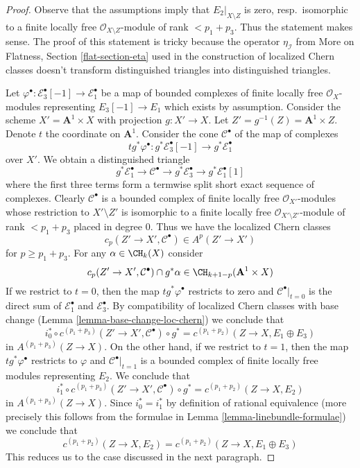 \begin{proof}
Observe that the assumptions imply that $E_2|_{X \setminus Z}$ is zero,
resp.\ isomorphic to a finite locally free $\mathcal{O}_{X \setminus Z}$-module
of rank $< p_1 + p_3$. Thus the statement makes sense. The proof of this
statement is tricky because the operator $\eta_\mathcal{I}$ from
More on Flatness, Section \ref{flat-section-eta} used in the construction
of localized Chern classes doesn't transform distinguished triangles into
distinguished triangles.

\medskip\noindent
Let $\varphi^\bullet : \mathcal{E}_3^\bullet[-1] \to \mathcal{E}_1^\bullet$
be a map of bounded complexes of finite locally free $\mathcal{O}_X$-modules
representing $E_3[-1] \to E_1$ which exists by assumption. Consider the scheme
$X' = \mathbf{A}^1 \times X$ with projection
$g : X' \to X$. Let $Z' = g^{-1}(Z) = \mathbf{A}^1 \times Z$.
Denote $t$ the coordinate on $\mathbf{A}^1$. Consider the cone
$\mathcal{C}^\bullet$ of the map of complexes
$$
t g^*\varphi^\bullet :
g^*\mathcal{E}_3^\bullet[-1]
\longrightarrow
g^*\mathcal{E}_1^\bullet
$$
over $X'$. We obtain a distinguished triangle
$$
g^*\mathcal{E}_1^\bullet \to \mathcal{C}^\bullet \to
g^*\mathcal{E}_3^\bullet \to g^*\mathcal{E}_1^\bullet[1]
$$
where the first three terms form a termwise split short exact
sequence of complexes. Clearly $\mathcal{C}^\bullet$ is a
bounded complex of finite locally free $\mathcal{O}_{X'}$-modules
whose restriction to $X' \setminus Z'$ is isomorphic to a
finite locally free
$\mathcal{O}_{X' \setminus Z'}$-module of rank $< p_1 + p_3$
placed in degree $0$. Thus we have the localized Chern classes
$$
c_p(Z' \to X', \mathcal{C}^\bullet) \in A^p(Z' \to X')
$$
for $p \geq p_1 + p_3$. For any $\alpha \in \CH_k(X)$ consider
$$
c_p(Z' \to X', \mathcal{C}^\bullet) \cap g^*\alpha
\in \CH_{k + 1 - p}(\mathbf{A}^1 \times X)
$$
If we restrict to $t = 0$, then the map $t g^*\varphi^\bullet$
restricts to zero and $\mathcal{C}^\bullet|_{t = 0}$
is the direct sum of $\mathcal{E}_1^\bullet$ and $\mathcal{E}_3^\bullet$.
By compatibility of localized Chern classes with base change
(Lemma \ref{lemma-base-change-loc-chern}) we conclude that
$$
i_0^* \circ c^{(p_1 + p_3)}(Z' \to X', \mathcal{C}^\bullet) \circ g^* =
c^{(p_1 + p_2)}(Z \to X, E_1 \oplus E_3)
$$
in $A^{(p_1 + p_3)}(Z \to X)$. On the other hand, if we restrict to $t = 1$,
then the map $t g^*\varphi^\bullet$
restricts to $\varphi$ and $\mathcal{C}^\bullet|_{t = 1}$
is a bounded complex of finite locally free modules representing $E_2$.
We conclude that
$$
i_1^* \circ c^{(p_1 + p_3)}(Z' \to X', \mathcal{C}^\bullet) \circ g^* =
c^{(p_1 + p_2)}(Z \to X, E_2)
$$
in $A^{(p_1 + p_3)}(Z \to X)$. Since $i_0^* = i_1^*$ by definition of
rational equivalence (more precisely this follows from the formulae in
Lemma \ref{lemma-linebundle-formulae}) we conclude that
$$
c^{(p_1 + p_2)}(Z \to X, E_2) = c^{(p_1 + p_2)}(Z \to X, E_1 \oplus E_3)
$$
This reduces us to the case discussed in the next paragraph.


\end{proof}
